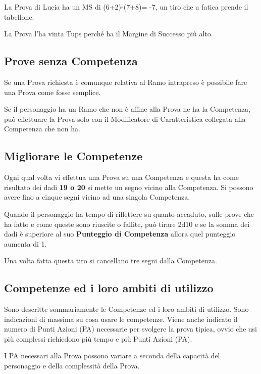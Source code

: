 \documentclass[12pt,a4paper,twoside,openany]{book}
\begin{document}
\begin{multicols}{2}
La Prova di Lucia ha un MS di (6+2)-(7+8)= -7, un tiro che a fatica prende il tabellone.

La Prova l'ha vinta Tups perché ha il Margine di Successo più alto.

\subsection{Prove senza Competenza}

Se una Prova richiesta è comunque relativa al Ramo intrapreso è possibile fare una Prova come fosse semplice.

Se il personaggio ha un Ramo che non è affine alla Prova ne ha la Competenza, può effettuare la Prova solo con il Modificatore di Caratteristica collegata alla Competenza che non ha.

\subsection{Migliorare le Competenze}\hypertarget{Migliorare le Competenze}{} \label{Migliorare le Competenze}

Ogni qual volta vi effettua una Prova su una Competenza e questa ha come risultato dei dadi \textbf{19 o 20} si mette un segno vicino alla Competenza. Si possono avere fino a cinque segni vicino ad una singola Competenza.

Quando il personaggio ha tempo di riflettere su quanto accaduto, sulle prove che ha fatto e come queste sono riuscite o fallite, può tirare 2d10 e se la somma dei dadi è superiore al suo \textbf{Punteggio di Competenza} allora quel punteggio aumenta di 1.

Una volta fatta questa tiro si cancellano tre segni dalla Competenza.	

\subsection{Competenze ed i loro ambiti di utilizzo}\label{competenzeambitidiutilizzo}

Sono descritte sommariamente le Competenze ed i loro ambiti di utilizzo. Sono indicazioni di massima su cosa usare le competenze. Viene anche indicato il numero di Punti Azioni (PA) necessarie per svolgere la prova tipica, ovvio che usi più complessi richiedono più tempo e più Punti Azioni (PA).

I PA necessari alla Prova possono variare a seconda della capacità del personaggio e della complessità della Prova.


\end{multicols}
\end{document}
